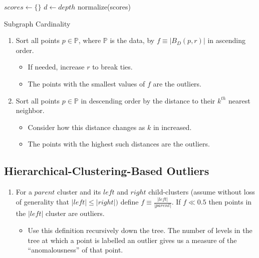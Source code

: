 \begin{algorithm}
\DontPrintSemicolon
\SetAlgoLined
{}
 $scores \leftarrow \{\}$\;
 $d \leftarrow depth$\;
 normalize(scores)\;
 \caption{Subgraph Cardinality}
 \label{alg-sgc}
\end{algorithm}

\begin{enumerate}
    \item Sort all points $p \in \mathbb{P}$, where $\mathbb{P}$ is the data, by $f \equiv |B_D(p, r)|$ in ascending order.
    \begin{itemize}
        \item If needed, increase $r$ to break ties.
        \item The points with the smallest values of $f$ are the outliers.
    \end{itemize}
    \item Sort all points $p \in \mathbb{P}$ in descending order by the distance to their $k^{th}$ nearest neighbor.
    \begin{itemize}
        \item Consider how this distance changes as $k$ in increased.
        \item The points with the highest such distances are the outliers.
    \end{itemize}
\end{enumerate}

\subsection{Hierarchical-Clustering-Based Outliers}

\begin{enumerate}
    \item For a $parent$ cluster and its $left$ and $right$ child-clusters (assume without loss of generality that $|left| \leq |right|)$ define $f \equiv \frac{|left|}{|parent|}$. If $f \ll 0.5$ then points in the $|left|$ cluster are outliers.
    \begin{itemize}
        \item Use this definition recursively down the tree. The number of levels in the tree at which a point is labelled an outlier gives us a measure of the ``anomalousness'' of that point.
    \end{itemize}
\end{enumerate}

